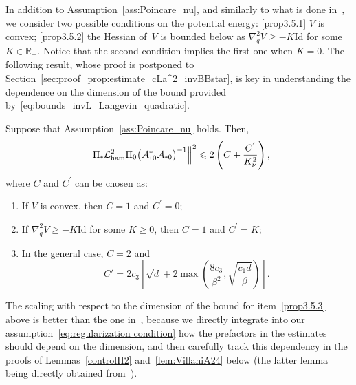 \documentclass[10pt]{amsart}
\theoremstyle{definition}\newtheorem{defi}[theo]{Definition}\newtheorem{rema}[theo]{Remark}\newtheorem{exam}[theo]{Example}\newtheorem{exem}[theo]{Example}\newtheorem{nota}[theo]{Notation}
\newcommand{\Id}{\mathrm{Id}}
\newcommand{\cLa}{\mathcal{A}}
\newcommand{\R}{\mathbb{R}}
\newcommand{\cLham}{\mathcal{L}_{\rm ham}}
\newcommand{\subplus}{\textnormal{\texttt{+}}}
\renewcommand{\leq}{\leqslant}
\renewcommand{\geq}{\geqslant}
\newcommand*{\romanenumi}{\renewcommand*{\theenumi}{\roman{enumi}}}
\begin{document}
In addition to Assumption~\ref{ass:Poincare_nu}, and similarly to what is done in~\cite{CLW19}, we consider two possible conditions on the potential energy: \eqref{prop3.5.1} $V$ is convex; \eqref{prop3.5.2} the Hessian of~$V$ is bounded below as $\nabla^{2}_{q}V \geq -K \Id$ for some $K \in \R_+$. Notice that the second condition implies the first one when $K = 0$. The following result, whose proof is postponed to Section~\ref{sec:proof_prop:estimate_cLa^2_invBBstar}, is key in understanding the dependence on the dimension of the bound provided by~\eqref{eq:bounds_invL_Langevin_quadratic}.

\begin{prop}\label{prop:estimate_cLa^2_invBBstar}
Suppose that Assumption~\ref{ass:Poincare_nu} holds. Then,
\[
\left\| \Pi_\subplus \cLham^2 \Pi_0\big(\cLa_{\subplus 0}^*\cLa_{\subplus 0}\big)^{-1} \right\|^2 \leq 2 \left(C+\frac{C^{'}}{K_\nu^2}\right),
\]
where $C$ and $C^{'}$ can be chosen as:
\begin{enumerate}\romanenumi
\item\label{prop3.5.1} If $V$ is convex, then $C=1$ and $C^{'}=0$;
\item\label{prop3.5.2} If $\nabla_q^2 V \geq -K \Id$ for some $K \geq 0$, then $C=1$ and $C^{'}=K$;
\item\label{prop3.5.3} In the general case, $C=2$ and
\[
C' = 2c_3\left[\sqrt{d}+2\max\left(\frac{8c_3}{\beta^2},\sqrt{\frac{c_1 d}{\beta}}\right) \right].
\]
\end{enumerate}
\end{prop}

The scaling with respect to the dimension of the bound for item~\eqref{prop3.5.3} above is better than the one in~\cite{CLW19}, because we directly integrate into our assumption~\eqref{eq:regularization condition} how the prefactors in the estimates should depend on the dimension, and then carefully track this dependency in the proofs of Lemmas~\ref{controlH2} and~\ref{lem:VillaniA24} below (the latter lemma being directly obtained from~\cite[Lemma~A.24]{Villani09}).

\end{document}
